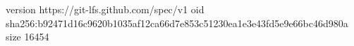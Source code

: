 version https://git-lfs.github.com/spec/v1
oid sha256:b92471d16c9620b1035af12ca66d7e853c51230ea1e3e43fd5e9e66bc46d980a
size 16454
